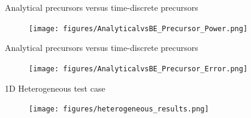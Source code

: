 \documentclass[8pt]{beamer}
\newcommand{\bi}{\begin{itemize}}
\newcommand{\ei}{\end{itemize}}
\begin{document}
\begin{frame}{Analytical precursors versus time-discrete precursors}

\begin{figure}[h]
\texttt{[image: figures/AnalyticalvsBE\_Precursor\_Power.png]}
\label{fig:IQS}
\end{figure}

\end{frame}

\begin{frame}{Analytical precursors versus time-discrete precursors}

\begin{figure}[h]
\texttt{[image: figures/AnalyticalvsBE\_Precursor\_Error.png]}
\label{fig:IQS}
\end{figure}

\end{frame}

\begin{frame}{1D Heterogeneous test case}

\begin{figure}[h]
\texttt{[image: figures/heterogeneous\_results.png]}
\label{fig:IQS}
\end{figure}

\end{frame}
\end{document}
